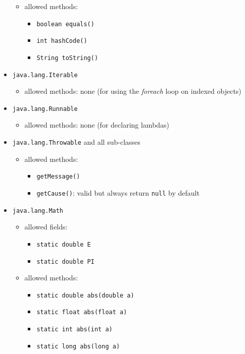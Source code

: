\documentclass[a4paper]{report}
\begin{document}
\begin{itemize}
\begin{itemize}
\begin{itemize}
			\end{itemize}
	\item allowed methods:
			\begin{itemize}
				\item \texttt{boolean equals()}
				\item \texttt{int hashCode()}
				\item \texttt{String toString()}
			\end{itemize}
	\end{itemize}
\item \texttt{java.lang.Iterable}
	\begin{itemize}
	\item allowed methods: none (for using the \emph{foreach} loop on indexed objects)
	\end{itemize}
\item \texttt{java.lang.Runnable}
	\begin{itemize}
	\item allowed methods: none (for declaring lambdas)
	\end{itemize}
\item \texttt{java.lang.Throwable} and all sub-classes
	\begin{itemize}
	\item allowed methods: 
			\begin{itemize}
				\item \texttt{getMessage()}
				\item \texttt{getCause()}: valid but always return \texttt{null} by default
			\end{itemize}
	\end{itemize}
\item \texttt{java.lang.Math}
	\begin{itemize}
	\item allowed fields: 
			\begin{itemize}
				\item \texttt{static double E}
				\item \texttt{static double	PI}
			\end{itemize}
	\item allowed methods: 
			\begin{itemize}
				\item \texttt{static double abs(double a)}
				\item \texttt{static float abs(float a)}
				\item \texttt{static int abs(int a)}
				\item \texttt{static long abs(long a)}

\end{itemize}
\end{itemize}
\end{itemize}
\end{document}
